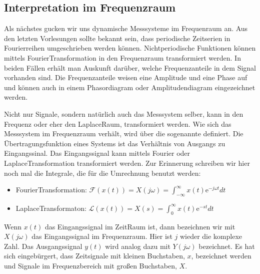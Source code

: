 \documentclass[letterpaper,10pt,english]{jupyterBook}
\begin{document}
\sphinxAtStartPar
{}


\subsection{Interpretation im Frequenzraum}
\label{\detokenize{content/5_ImpulsSprung:interpretation-im-frequenzraum}}
\sphinxAtStartPar


\sphinxAtStartPar
Als nächstes gucken wir uns dynamische Messsysteme im Frequenraum an.
Aus den letzten Vorlesungen sollte bekannt sein, dass periodische Zeitserien in Fourierreihen umgeschrieben werden können. Nicht\sphinxhyphen{}periodische Funktionen können mittels Fourier\sphinxhyphen{}Transformation in den Frequenzraum transformiert werden. In beiden Fällen erhält man Auskunft darüber, welche Frequenzanteile in dem Signal vorhanden sind. Die Frequenzanteile weisen eine Amplitude und eine Phase auf und können auch in einem Phasordiagram oder Amplitudendiagram eingezeichnet werden.

\sphinxAtStartPar
Nicht nur Signale, sondern natürlich auch das Messsystem selber, kann in den Frequenz\sphinxhyphen{} oder eher den Laplace\sphinxhyphen{}Raum, transformiert werden. Wie sich das Messsystem im Frequenzraum verhält, wird über die sogenannte  definiert. Die Übertragungsfunktion eines Systems ist das Verhältnis von Ausgangs\sphinxhyphen{} zu Eingangssinal. Das Eingangssignal kann mittels Fourier\sphinxhyphen{} oder Laplace\sphinxhyphen{}Transformation transformiert werden. Zur Erinnerung schreiben wir hier noch mal die Integrale, die für die Umrechnung benutzt werden:
\begin{itemize}
\item {} 
\sphinxAtStartPar
Fourier\sphinxhyphen{}Transformation: \(\mathcal F(x(t)) = X(j\omega) = \int_{-\infty}^{\infty} x(t) \mathrm e^{-j \omega t} dt\)

\item {} 
\sphinxAtStartPar
Laplace\sphinxhyphen{}Transformaton: \(\mathcal L(x(t)) = X(s) = \int_{0}^{\infty} x(t) \mathrm e^{-st} dt\)

\end{itemize}

\sphinxAtStartPar
Wenn \(x(t)\) das Eingangssignal im Zeit\sphinxhyphen{}Raum ist, dann bezeichnen wir mit \(X(j \omega)\) das Eingangssignal im Frequenzraum. Hier ist \(j\) wieder die komplexe Zahl. Das Ausgangssignal \(y(t)\) wird analog dazu mit \(Y(j \omega)\) bezeichnet. Es hat sich eingebürgert, dass Zeitsignale mit kleinen Buchstaben, \(x\), bezeichnet werden und Signale im Frequenzbereich mit großen Buchstaben, \(X\).
\end{document}
